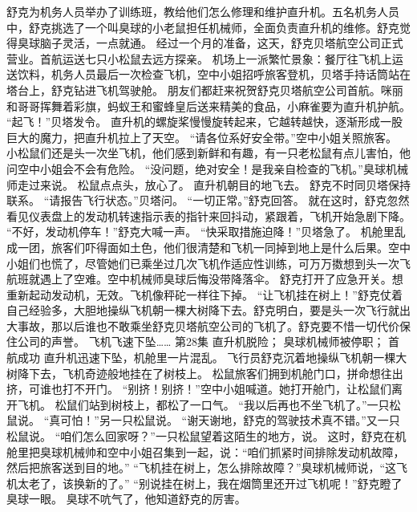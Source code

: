 \documentclass[a4paper,12pt,UTF8,twoside]{ctexbook}
\begin{document}
        舒克为机务人员举办了训练班，教给他们怎么修理和维护直升机。五名机务人员中，舒克挑选了一个叫臭球的小老鼠担任机械师，全面负责直升机的维修。舒克觉得臭球脑子灵活，一点就通。 
        经过一个月的准备，这天，舒克贝塔航空公司正式营业。首航运送七只小松鼠去远方探亲。 
        机场上一派繁忙景象：餐厅往飞机上运送饮料，机务人员最后一次检查飞机，空中小姐招呼旅客登机，贝塔手持话筒站在塔台上，舒克钻进飞机驾驶舱。 
        朋友们都赶来祝贺舒克贝塔航空公司首航。咪丽和哥哥挥舞着彩旗，蚂蚁王和蜜蜂皇后送来精美的食品，小麻雀要为直升机护航。 
        “起飞！”贝塔发令。 
        直升机的螺旋桨慢慢旋转起来，它越转越快，逐渐形成一股巨大的魔力，把直升机拉上了天空。 
        “请各位系好安全带。”空中小姐关照旅客。 
        小松鼠们还是头一次坐飞机，他们感到新鲜和有趣，有一只老松鼠有点儿害怕，他问空中小姐会不会有危险。 
        “没问题，绝对安全！是我亲自检查的飞机。”臭球机械师走过来说。 
        松鼠点点头，放心了。 
        直升机朝目的地飞去。 
        舒克不时同贝塔保持联系。 
        “请报告飞行状态。”贝塔问。 
        “一切正常。”舒克回答。 
        就在这时，舒克忽然看见仪表盘上的发动机转速指示表的指针来回抖动，紧跟着，飞机开始急剧下降。 
        “不好，发动机停车！”舒克大喊一声。 
        “快采取措施迫降！”贝塔急了。 
        机舱里乱成一团，旅客们吓得面如土色，他们很清楚和飞机一同掉到地上是什么后果。空中小姐们也慌了，尽管她们已乘坐过几次飞机作适应性训练，可万万擞想到头一次飞航班就遇上了空难。空中机械师臭球后悔没带降落伞。 
        舒克打开了应急开关。想重新起动发动机，无效。飞机像秤砣一样往下掉。 
        “让飞机挂在树上！”舒克仗着自己经验多，大胆地操纵飞机朝一棵大树降下去。舒克明白，要是头一次飞行就出大事故，那以后谁也不敢乘坐舒克贝塔航空公司的飞机了。舒克要不惜一切代价保住公司的声誉。 
        飞机飞速下坠……   第28集 
        直升机脱险； 
        臭球机械师被停职； 
        首航成功   
        直升机迅速下坠，机舱里一片混乱。 
        飞行员舒克沉着地操纵飞机朝一棵大树降下去，飞机奇迹般地挂在了树枝上。 
        松鼠旅客们拥到机舱门口，拼命想往出挤，可谁也打不开门。 
        “别挤！别挤！”空中小姐喊道。她打开舱门，让松鼠们离开飞机。 
        松鼠们站到树枝上，都松了一口气。 
        “我以后再也不坐飞机了。”一只松鼠说。 
        “真可怕！”另一只松鼠说。 
        “谢天谢地，舒克的驾驶技术真不错。”又一只松鼠说。 
        “咱们怎么回家呀？”一只松鼠望着这陌生的地方，说。 
        这时，舒克在机舱里把臭球机械帅和空中小姐召集到一起，说：“咱们抓紧时间排除发动机故障，然后把旅客送到目的地。” 
        “飞机挂在树上，怎么排除故障？”臭球机械师说，“这飞机太老了，该换新的了。” 
        “别说挂在树上，我在烟筒里还开过飞机呢！”舒克瞪了臭球一眼。 
        臭球不吭气了，他知道舒克的厉害。 
\end{document}
